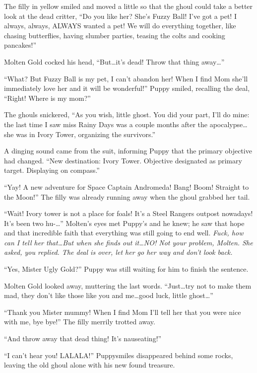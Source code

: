 The filly in yellow smiled and moved a little so that the ghoul could take a better look at the dead critter, ``Do you like her? She's Fuzzy Ball! I've got a pet! I always, always, ALWAYS wanted a pet! We will do everything together, like chasing butterflies, having slumber parties, teasing the colts and cooking pancakes!''

Molten Gold cocked his head, ``But\dots it's dead! Throw that thing away\dots''

``What? But Fuzzy Ball is my pet, I can't abandon her! When I find Mom she'll immediately love her and it will be wonderful!'' Puppy smiled, recalling the deal, ``Right! Where is my mom?''

The ghouls snickered, ``As you wish, little ghost. You did your part, I'll do mine: the last time I saw miss Rainy Days was a couple months after the apocalypse\dots she was in Ivory Tower, organizing the survivors.''

A dinging sound came from the suit, informing Puppy that the primary objective had changed. ``{\mt New destination: Ivory Tower. Objective designated as primary target. Displaying on compass.}''

``Yay! A new adventure for Space Captain Andromeda! Bang! Boom! Straight to the Moon!'' The filly was already running away when the ghoul grabbed her tail.

``Wait! Ivory tower is not a place for foals! It's a Steel Rangers outpost nowadays! It's been two hu-\dots'' Molten's eyes met Puppy's and he knew; he saw that hope and that incredible faith that everything was still going to end well. \emph{Fuck, how can I tell her that\dots But when she finds out it\dots NO! Not your problem, Molten. She asked, you replied. The deal is over, let her go her way and don't look back.}

``Yes, Mister Ugly Gold?'' Puppy was still waiting for him to finish the sentence.

Molten Gold looked away, muttering the last words. ``Just\dots try not to make them mad, they don't like those like you and me\dots good luck, little ghost\dots''

``Thank you Mister mummy! When I find Mom I'll tell her that you were nice with me, bye bye!'' The filly merrily trotted away.

``And throw away that dead thing! It's nauseating!''

``I can't hear you! LALALA!'' Puppysmiles disappeared behind some rocks, leaving the old ghoul alone with his new found treasure.

